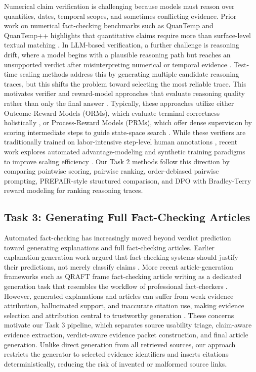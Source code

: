 \documentclass[
]{ceurart}
\begin{document}
Numerical claim verification is challenging because models must reason over quantities, dates, temporal scopes, and sometimes conflicting evidence. 
Prior work on numerical fact-checking benchmarks such as QuanTemp and QuanTemp++ highlights that quantitative claims require more than surface-level textual matching \cite{quantemp, quantempplus}. 
In LLM-based verification, a further challenge is reasoning drift, where a model begins with a plausible reasoning path but reaches an unsupported verdict after misinterpreting numerical or temporal evidence \cite{verifierfc}. 
Test-time scaling methods address this by generating multiple candidate reasoning traces, but this shifts the problem toward selecting the most reliable trace. 
This motivates verifier and reward-model approaches that evaluate reasoning quality rather than only the final answer \cite{lightman2023prm, setlur2024prm,GenPRM}. 
Typically, these approaches utilize either Outcome-Reward Models (ORMs), which evaluate terminal correctness holistically \cite{cobbe2021orm}, or Process-Reward Models (PRMs), which offer dense supervision by scoring intermediate steps to guide state-space search \cite{uesato2022process}. 
While these verifiers are traditionally trained on labor-intensive step-level human annotations \cite{lightman2023prm}, recent work explores automated advantage-modeling and synthetic training paradigms to improve scaling efficiency \cite{setlur2024prm, lilei2024pqm}.
Our Task 2 methods follow this direction by comparing pointwise scoring, pairwise ranking, order-debiased pairwise prompting, PREPAIR-style structured comparison, and DPO with Bradley-Terry reward modeling for ranking reasoning traces.

\subsection{Task 3: Generating Full Fact-Checking Articles}

Automated fact-checking has increasingly moved beyond verdict prediction toward generating explanations and full fact-checking articles. Earlier explanation-generation work argued that fact-checking systems should justify their predictions, not merely classify claims \cite{atanasova2020generating}. More recent article-generation frameworks such as QRAFT frame fact-checking article writing as a dedicated generation task that resembles the workflow of professional fact-checkers \cite{sahnan2026qraft}. However, generated explanations and articles can suffer from weak evidence attribution, hallucinated support, and inaccurate citation use, making evidence selection and attribution central to trustworthy generation \cite{xing2025evidence}. These concerns motivate our Task 3 pipeline, which separates source usability triage, claim-aware evidence extraction, verdict-aware evidence packet construction, and final article generation. Unlike direct generation from all retrieved sources, our approach restricts the generator to selected evidence identifiers and inserts citations deterministically, reducing the risk of invented or malformed source links.
\end{document}
